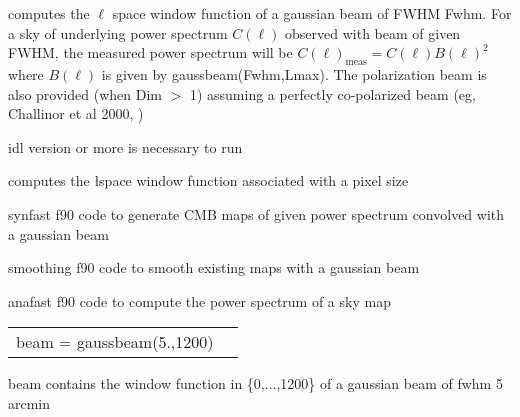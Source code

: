 
\begin{codedescription}
{\facname{} computes the $\ell$ space window function of a gaussian beam of FWHM
Fwhm. For a sky of underlying power spectrum $C(\ell)$ observed with beam of
given FWHM, the measured power spectrum will be $C(\ell)_\mathrm{meas} = C(\ell)
B(\ell)^2$ where $B(\ell)$ is given by gaussbeam(Fwhm,Lmax). The
polarization beam is also provided (when Dim $>$ 1) assuming a perfectly
co-polarized beam (eg, Challinor et al 2000, 
)}
\end{codedescription}



\begin{related}
  \begin{sulist}{} %
    \item[idl] version \idlversion or more is necessary to run \facname
    \item[\htmlref{healpixwindow}{idl:healpixwindow}] computes the \l space window function associated with
    a \healpix pixel size
    \item[synfast] f90 code to generate CMB maps of given power spectrum convolved with a gaussian beam
    \item[smoothing] f90 code to smooth existing \healpix maps with a gaussian beam
    \item[anafast] f90 code to compute the power spectrum of a \healpix sky map
  \end{sulist}
\end{related}

\begin{example}
{
\begin{tabular}{ll} %
beam = gaussbeam(5.,1200)
\end{tabular}
}
{
beam contains the window function in \{0,...,1200\} of a gaussian beam of fwhm 5 arcmin}
\end{example}



